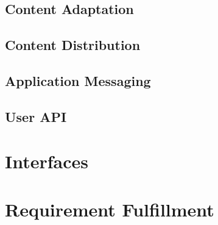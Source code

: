 \subsection{Content Adaptation\label{sec:des_ar_ov}}
\subsection{Content Distribution\label{sec:des_cdn}}	
	
	\subsection{Application Messaging\label{sec:des_me}}
	
	\subsection{User API\label{sec:des_api}}

\section{Interfaces\label{sec:des_inter}}

\section{Requirement Fulfillment\label{sec:des_inter}}